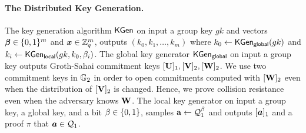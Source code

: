 
\paragraph{The Distributed Key Generation.} The key generation algorithm
$\mathsf{KGen}$ on input a group key $gk$ and vectors ${\boldsymbol{\beta}}\in\{0,1\}^m$ and ${\boldsymbol{x}}\in\mathbb{Z}_q^m$,  outputs $(k_0,k_1,\ldots,k_m)$ where $k_0 \gets \mathsf{KGen}_\mathsf{global}(gk)$ and  $k_i\gets \mathsf{KGen}_{\mathsf{local}}(gk,k_0,\beta_i)$. The global key generator $\mathsf{KGen}_\mathsf{global}$ on input a group key outputs Groth-Sahai commitment keys $[\mathbf{{U}}]_1,[\mathbf{{V}}]_2,[\mathbf{{W}}]_2$. We use two commitment keys in $\mathbb{G}_2$ in order to open commitments computed with $[\mathbf{{W}}]_2$ even when the distribution of $[\mathbf{{V}}]_2$ is changed. Hence, we prove collision resistance even when the adversary knows $\mathbf{{W}}$. The local key generator on input a group key, a global key, and a bit $\beta\in\{0,1\}$, samples $\mathbf{{a}}\gets\mathcal{Q}_1^\beta$ and outputs $[{\boldsymbol{a}}]_1$ and a proof $\pi$ that ${\boldsymbol{a}}\in\mathcal{Q}_1$.
